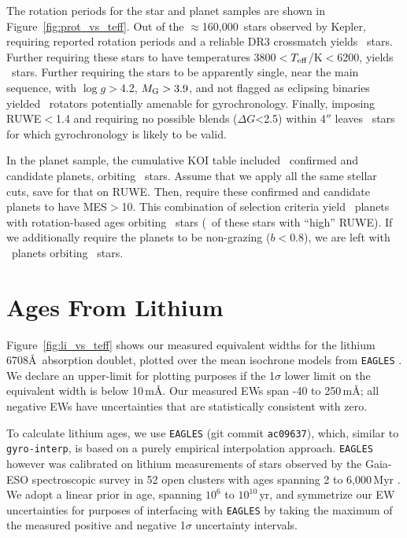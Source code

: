 \documentclass[11pt,twocolumn,tighten]{aastex63}
\newcommand{\nkeplerstars}{$\approx$160{,}000}
\begin{document}
The rotation periods for the star and planet samples are shown
in Figure~\ref{fig:prot_vs_teff}.  Out of the \nkeplerstars\ stars
observed by Kepler, requiring reported rotation periods and a reliable
DR3 crossmatch yields \nuniqstarsantosrot\ stars.  Further requiring
these stars to have temperatures 3800$<$$T_{\rm
eff}$/K$<$6200, yields \nuniqstarsantosrotteffcut\
stars.  Further requiring the stars to be apparently single, near the main
sequence, with $\log g$$>$4.2, $M_{\rm G}>3.9$, and not flagged as
eclipsing binaries yielded \nuniqstarsantosallbutruwe\ rotators
potentially amenable for gyrochronology.  Finally, imposing RUWE$<$1.4
and requiring no possible blends ($\Delta G$<2.5) within 4$''$ leaves
\nuniqstarsantosrotgyroappl\ stars for which gyrochronology is likely
to be valid.


In the planet sample, the cumulative KOI table included
\nnonfpcumkois\ confirmed and candidate planets, orbiting
\nnonfpcumkoihosts\ stars.  Assume that we apply all the same stellar
cuts, save for that on RUWE.  Then, require these confirmed and
candidate planets to have MES$>$10.  This combination of selection
criteria yield \nplwgyroagewithgrazingandhighruwe\ planets with
rotation-based ages orbiting
\nplhoststarwgyroagewithgrazingandhighruwe\ stars
(\nplhoststarwgyroagejusthighruwe\ of these stars with ``high'' RUWE).
If we additionally require the planets to be non-grazing ($b<0.8$),
we are left with \nplwgyroagenograzing\ planets orbiting
\nplhoststarwgyroagenograzing\ stars.




\section{Ages From Lithium}
\label{sec:liage}


Figure~\ref{fig:li_vs_teff} shows our measured equivalent widths for
the lithium 6708\AA\ absorption doublet, plotted over the mean
isochrone models from \texttt{EAGLES} \citep{Jeffries_2023}.  We
declare an upper-limit for plotting purposes if the 1$\sigma$ lower
limit on the equivalent width is below 10\,m\AA.  Our measured EWs
span -40 to 250\,m\AA; all negative EWs have uncertainties that are
statistically consistent with zero.

To calculate lithium ages, we use \texttt{EAGLES} (git commit
\texttt{ac09637}), which, similar to
\texttt{gyro-interp}, is based on a purely empirical interpolation
approach.  \texttt{EAGLES} however was calibrated on lithium measurements of
stars observed by the
Gaia-ESO spectroscopic survey in 52 open clusters with ages spanning 2
to 6{,}000\,Myr \citep{Jeffries_2023}.  We adopt a linear prior in
age, spanning $10^6$ to $10^{10}$\,yr, and symmetrize our EW
uncertainties for purposes of interfacing with \texttt{EAGLES} by
taking the maximum of the measured positive and negative 1$\sigma$
uncertainty intervals.
\end{document}

